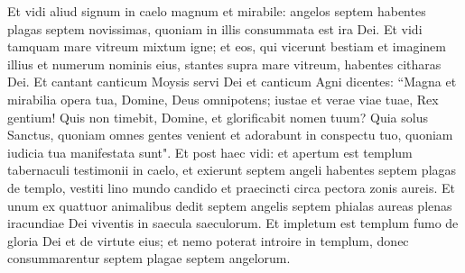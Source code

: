 \begin{biblechapter}  
\verse Et vidi aliud signum in caelo magnum et mirabile: angelos septem habentes plagas septem novissimas, quoniam in illis consummata est ira Dei. 
\verse Et vidi tamquam mare vitreum mixtum igne; et eos, qui vicerunt bestiam et imaginem illius et numerum nominis eius, stantes supra mare vitreum, habentes citharas Dei. 
\verse Et cantant canticum Moysis servi Dei et canticum Agni dicentes: “Magna et mirabilia opera tua, Domine, Deus omnipotens; iustae et verae viae tuae, Rex gentium! 
\verse Quis non timebit, Domine, et glorificabit nomen tuum? Quia solus Sanctus, quoniam omnes gentes venient et adorabunt in conspectu tuo, quoniam iudicia tua manifestata sunt". 
\verse Et post haec vidi: et apertum est templum tabernaculi testimonii in caelo,  
\verse et exierunt septem angeli habentes septem plagas de templo, vestiti lino mundo candido et praecincti circa pectora zonis aureis. 
\verse Et unum ex quattuor animalibus dedit septem angelis septem phialas aureas plenas iracundiae Dei viventis in saecula saeculorum. 
\verse Et impletum est templum fumo de gloria Dei et de virtute eius; et nemo poterat introire in templum, donec consummarentur septem plagae septem angelorum. 
\end{biblechapter}

